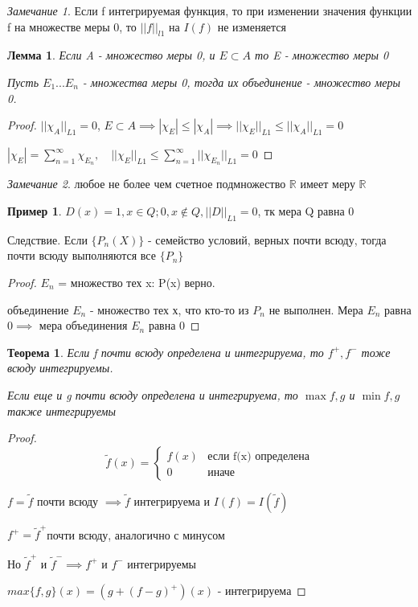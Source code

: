 \documentclass[a4paper]{article}
\newtheorem{theorem}{Теорема}[section]
\newtheorem{lemma}{Лемма}[section]
\theoremstyle{definition}
\newtheorem*{example}{Пример}
\theoremstyle{remark}
\newtheorem*{remark}{Замечание}
\begin{document}
\begin{remark}
     Если f интегрируемая функция, то при изменении значения функции f на множестве меры 0, то $||f||_{l1}$ на $I(f)$ не изменяется
\end{remark}
\begin{lemma}
     Если A - множество меры 0, и $E\subset A$ то E - множество меры 0
     
     Пусть $E_1...E_n$ -  множества меры 0, тогда их объединение - множество меры 0.
\end{lemma}
\begin{proof}
     $||\chi_A||_{L1} = 0$, $E\subset A\implies |\chi_E|\leq |\chi_A|\implies ||\chi_E||_{L1}\leq ||\chi_A||_{L1} = 0$

     $|\chi_E| = \sum_{n = 1}^{\infty} \chi_{E_n}, \quad ||\chi_E||_{L1} \leq\sum_{n = 1}^{\infty} ||\chi_{E_n}||_{L1} = 0$
\end{proof}

\begin{remark}
     любое не более чем счетное подмножество $\mathbb{R} $ имеет меру $\mathbb{R} $
\end{remark}
\begin{example}
     $D(x) = 1, x\in Q; 0, x\notin Q, ||D||_{L1} = 0$, тк мера Q равна 0
\end{example}
Следствие. Если $\{P_n(X)\}$ - семейство условий, верных почти всюду, тогда почти всюду выполняются все $\{P_n\}$
\begin{proof}
     $E_n$ = множество тех x: P(x) верно.

     объединение $E_n$ -  множество тех х, что кто-то из $P_n$ не выполнен. Мера $E_n$ равна $0\implies$ мера объединения $E_n$ равна 0
\end{proof}
\begin{theorem}
     Если f почти всюду определена и интегрируема, то $f^+, f^-$ тоже всюду интегрируемы.

     Если еще и g почти всюду определена и интегрируема, то $\max{f, g}$ и $\min{f, g}$ также интегрируемы
\end{theorem}
\begin{proof}
     
     \begin{equation*}
          \text{$\widetilde{f}(x) = $}
          \begin{cases}
               f(x) & \text{если f(x) определена} \\
               0 & \text{иначе}
          \end{cases}
     \end{equation*}
     

     $ f = \widetilde{f}$ почти всюду $\implies \widetilde{f}$ интегрируема и $I(f) = I(\widetilde{f})$

     $f^+ = \widetilde{f}^+$почти всюду, аналогично с минусом

     Но $\widetilde{f}^+$ и $\widetilde{f}^-\implies f^+ $ и $f^-$ интегрируемы 

     $max\{f, g\}(x) = (g+(f-g)^+)(x)$ - интегрируема
\end{proof}
\end{document}

